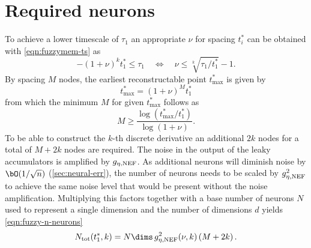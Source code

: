 \section{Required neurons}\label{apdx:fuzzymem-neurons}
To achieve a lower timescale of $\tau_1$ an appropriate $\nu$ for spacing $t^*_i$ can be obtained with \cref{eqn:fuzzymem-ts} as
\begin{equation}
    -{(1+\nu)}^k t^*_1 \leq \tau_1 \quad\Leftrightarrow\quad \nu \leq \sqrt[k]{\tau_1 / t^*_1} - 1 \text{.}
\end{equation}
By spacing $M$ nodes, the earliest reconstructable point $t^*_{\max}$ is given by
\begin{equation}
    t^*_{\max} = {(1+\nu)}^M t^*_1
\end{equation}
from which the minimum $M$ for given $t^*_{\max}$ follows as
\begin{equation}
    M \geq \frac{\log(t^*_{\max} / t^*_1)}{\log(1+\nu)} \text{.}
\end{equation}
To be able to construct the $k$-th discrete derivative an additional $2k$ nodes for a total of $M + 2k$ nodes are required.
The noise in the output of the leaky accumulators is amplified by $g_{\eta,{\mathrm{NEF}}}$.
As additional neurons will diminish noise by $\bO(1/\sqrt{n})$ (\cref{sec:neural-err}), the number of neurons needs to be scaled by $g_{\eta,{\mathrm{NEF}}}^2$ to achieve the same noise level that would be present without the noise amplification.
Multiplying this factors together with a base number of neurons $N$ used to represent a single dimension and the number of dimensions $d$ yields \cref{eqn:fuzzy-n-neurons}
\begin{equation*}
    N_{\ped{tot}}(t^*_1, k) = N \dims\, g_{\eta,\ped{NEF}}^2(\nu, k) \del{M + 2k} \text{.}
\end{equation*}
